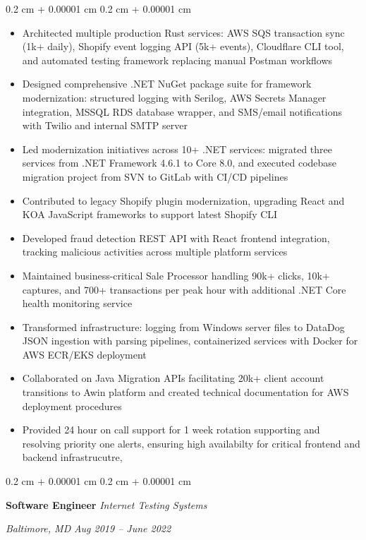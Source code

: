 \documentclass[10pt, letterpaper]{article}
\newenvironment{highlights}{
    \begin{itemize}[
        topsep=0.10 cm,
        parsep=0.10 cm,
        partopsep=0pt,
        itemsep=0pt,
        leftmargin=0.4 cm + 10pt
        ]
    }{
\end{itemize}
} %
\newenvironment{onecolentry}{
    \begin{adjustwidth}{
            0.2 cm + 0.00001 cm
        }{
            0.2 cm + 0.00001 cm
        }
    }{
    \end{adjustwidth}
} %
\newenvironment{twocolentry}[2][]{
    \onecolentry
    \def\secondColumn{#2}
    \setcolumnwidth{\fill, 10.5 cm}
    \begin{paracol}{2}
    }{
        \switchcolumn \raggedleft \secondColumn
    \end{paracol}
    \endonecolentry
} %
\begin{document}
\begin{onecolentry}
    \begin{highlights}
        \item Architected multiple production Rust services: AWS SQS transaction sync (1k+ daily), Shopify event logging API (5k+ events), Cloudflare CLI tool, and automated testing framework replacing manual Postman workflows
        \item Designed comprehensive .NET NuGet package suite for framework modernization: structured logging with Serilog, AWS Secrets Manager integration, MSSQL RDS database wrapper, and SMS/email notifications with Twilio and internal SMTP server
        \item Led modernization initiatives across 10+ .NET services: migrated three services from .NET Framework 4.6.1 to Core 8.0, and executed codebase migration project from SVN to GitLab with CI/CD pipelines
        \item Contributed to legacy Shopify plugin modernization, upgrading React and KOA JavaScript frameworks to support latest Shopify CLI
        \item Developed fraud detection REST API with React frontend integration, tracking malicious activities across multiple platform services
        \item Maintained business-critical Sale Processor handling 90k+ clicks, 10k+ captures, and 700+ transactions per peak hour with additional .NET Core health monitoring service
        \item Transformed infrastructure: logging from Windows server files to DataDog JSON ingestion with parsing pipelines, containerized services with Docker for AWS ECR/EKS deployment
        \item Collaborated on Java Migration APIs facilitating 20k+ client account transitions to Awin platform and created technical documentation for AWS deployment procedures
        \item Provided 24 hour on call support for 1 week rotation supporting and resolving priority one alerts, ensuring high availabilty for critical frontend and backend infrastrucutre,
        \end{highlights}
\end{onecolentry}
    \vspace{0.2 cm}
    \begin{twocolentry}{
            \textit{Baltimore, MD}
        \textit{Aug 2019 – June 2022}}
        \textbf{Software Engineer}
        \newline
        \textit{Internet Testing Systems}
    \end{twocolentry}
\end{document}
